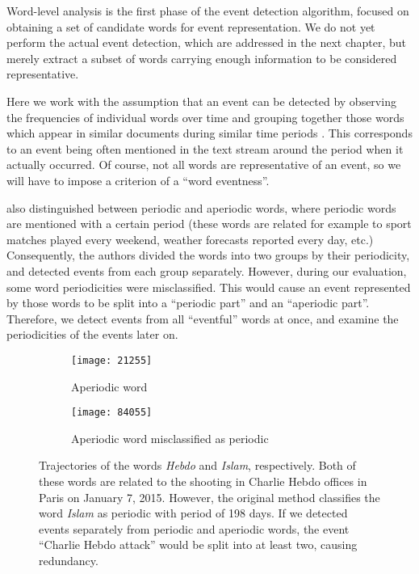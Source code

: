 Word-level analysis is the first phase of the event detection algorithm, focused on obtaining a set of candidate words for event representation. We do not yet perform the actual event detection, which are addressed in the next chapter, but merely extract a subset of words carrying enough information to be considered representative.

Here we work with the assumption that an event can be detected by observing the frequencies of individual words over time and grouping together those words which appear in similar documents during similar time periods \citep{event-detection, parameter-free}. This corresponds to an event being often mentioned in the text stream around the period when it actually occurred. Of course, not all words are representative of an event, so we will have to impose a criterion of a ``word eventness''.

\cite{event-detection} also distinguished between periodic and aperiodic words, where periodic words are mentioned with a certain period (these words are related for example to sport matches played every weekend, weather forecasts reported every day, etc.) Consequently, the authors divided the words into two groups by their periodicity, and detected events from each group separately. However, during our evaluation, some word periodicities were misclassified. This would cause an event represented by those words to be split into a ``periodic part'' and an ``aperiodic part''. Therefore, we detect events from all ``eventful'' words at once, and examine the periodicities of the events later on.

\begin{figure}
\centering
\begin{subfigure}{.5\textwidth}
  \centering
  \texttt{[image: 21255]}  %
  \caption{Aperiodic word}
  \label{fig:hebdo}
\end{subfigure}%
\begin{subfigure}{.5\textwidth}
  \centering
  \texttt{[image: 84055]}  %
  \caption{Aperiodic word misclassified as periodic}
  \label{fig:islam}
\end{subfigure}
\caption{Trajectories of the words \textit{Hebdo} and \textit{Islam}, respectively. Both of these words are related to the shooting in Charlie Hebdo offices in Paris on January 7, 2015. However, the original method classifies the word \textit{Islam} as periodic with period of 198 days. If we detected events separately from periodic and aperiodic words, the event ``Charlie Hebdo attack'' would be split into at least two, causing redundancy.}
\end{figure}


